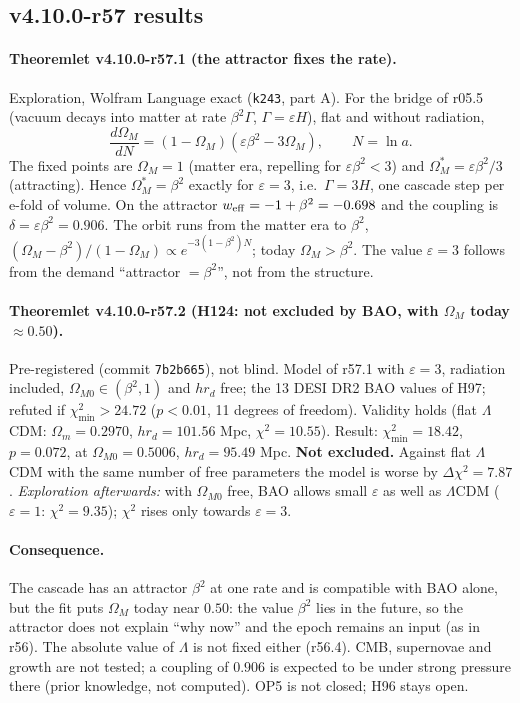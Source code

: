 \subsection*{v4.10.0-r57 results}
\label{subsec:v4100-r57-results}

\paragraph{Theoremlet v4.10.0-r57.1 (the attractor fixes the rate).}
Exploration, Wolfram Language exact (\texttt{k243}, part A).  For the bridge of r05.5 (vacuum decays into matter at rate \(\beta^2\Gamma\), \(\Gamma=\varepsilon H\)), flat and
without radiation,
\[
\frac{d\Omega_M}{dN}=(1-\Omega_M)(\varepsilon\beta^2-3\Omega_M),\qquad N=\ln a .
\]
The fixed points are \(\Omega_M=1\) (matter era, repelling for \(\varepsilon\beta^2<3\)) and \(\Omega_M^*=\varepsilon\beta^2/3\) (attracting).  Hence \(\Omega_M^*=\beta^2\) exactly
for \(\varepsilon=3\), i.e.\ \(\Gamma=3H\), one cascade step per e-fold of volume.  On the attractor \(w_{\rm eff}=-1+\beta^2=-0.698\) and the coupling is
\(\delta=\varepsilon\beta^2=0.906\).  The orbit runs from the matter era to \(\beta^2\), \((\Omega_M-\beta^2)/(1-\Omega_M)\propto e^{-3(1-\beta^2)N}\); today \(\Omega_M>\beta^2\).  The
value \(\varepsilon=3\) follows from the demand ``attractor \(=\beta^2\)'', not from the structure.

\paragraph{Theoremlet v4.10.0-r57.2 (H124: not excluded by BAO, with \(\Omega_M\) today \(\approx0.50\)).}
Pre-registered (commit \texttt{7b2b665}), not blind.  Model of r57.1 with \(\varepsilon=3\), radiation included, \(\Omega_{M0}\in(\beta^2,1)\) and \(hr_d\) free; the 13 DESI DR2
BAO values of H97; refuted if \(\chi^2_{\min}>24.72\) (\(p<0.01\), 11 degrees of freedom).  Validity holds (flat \(\Lambda\)CDM: \(\Omega_m=0.2970\), \(hr_d=101.56\) Mpc,
\(\chi^2=10.55\)).  Result: \(\chi^2_{\min}=18.42\), \(p=0.072\), at \(\Omega_{M0}=0.5006\), \(hr_d=95.49\) Mpc.  \textbf{Not excluded.}  Against flat \(\Lambda\)CDM with the same
number of free parameters the model is worse by \(\Delta\chi^2=7.87\).  \emph{Exploration afterwards:} with \(\Omega_{M0}\) free, BAO allows small \(\varepsilon\) as well as
\(\Lambda\)CDM (\(\varepsilon=1\): \(\chi^2=9.35\)); \(\chi^2\) rises only towards \(\varepsilon=3\).

\paragraph{Consequence.}
The cascade has an attractor \(\beta^2\) at one rate and is compatible with BAO alone, but the fit puts \(\Omega_M\) today near \(0.50\): the value \(\beta^2\) lies in the
future, so the attractor does not explain ``why now'' and the epoch remains an input (as in r56).  The absolute value of \(\Lambda\) is not fixed either
(r56.4).  CMB, supernovae and growth are not tested; a coupling of \(0.906\) is expected to be under strong pressure there (prior knowledge, not
computed).  OP5 is not closed; H96 stays open.

